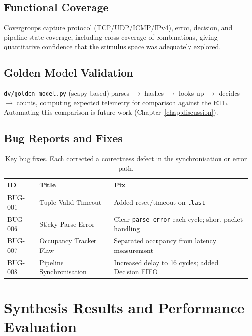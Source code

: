 \documentclass[12pt,twoside,openright]{book}
\begin{document}
\section{Functional Coverage}

Covergroups capture protocol (TCP/UDP/ICMP/IPv4), error, decision, and pipeline-state coverage,
including cross-coverage of combinations, giving quantitative confidence that the stimulus space
was adequately explored.

\section{Golden Model Validation}

\texttt{dv/golden\_model.py} (scapy-based) parses $\to$ hashes $\to$ looks up $\to$ decides $\to$
counts, computing expected telemetry for comparison against the RTL. Automating this comparison is
future work (Chapter~\ref{chap:discussion}).

\section{Bug Reports and Fixes}

\begin{table}[H]
\centering
\footnotesize
\begin{tabular}{llp{58mm}}
\toprule
\textbf{ID} & \textbf{Title} & \textbf{Fix} \\
\midrule
BUG-001 & Tuple Valid Timeout & Added reset/timeout on \texttt{tlast} \\
BUG-006 & Sticky Parse Error & Clear \texttt{parse\_error} each cycle; short-packet handling \\
BUG-007 & Occupancy Tracker Flaw & Separated occupancy from latency measurement \\
BUG-008 & Pipeline Synchronisation & Increased delay to 16 cycles; added Decision FIFO \\
\bottomrule
\end{tabular}
\caption{Key bug fixes. Each corrected a correctness defect in the synchronisation or error path.}
\label{tab:bugs}
\end{table}

\chapter{Synthesis Results and Performance Evaluation}
\label{chap:results}
\end{document}

